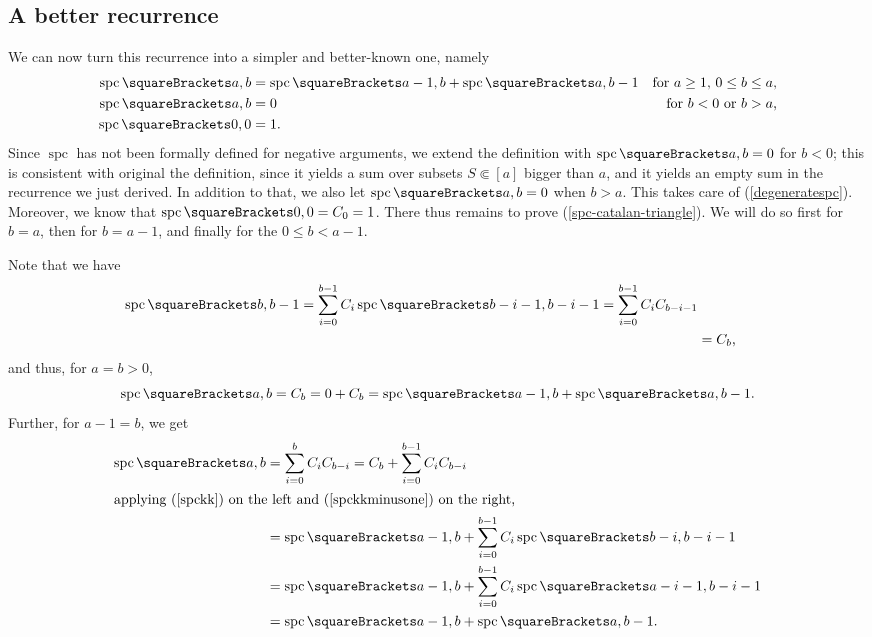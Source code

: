 \documentclass[10pt, a4paper, twoside]{basestyle}
\DeclareMathOperator{\spc}{spc}
\begin{document}
\subsection{A better recurrence}
We can now turn this recurrence into a simpler and better-known one, namely
\begin{align}
\spc\of{a,b} &= \spc\of{a-1, b} + \spc\of{a,b-1} & \text{for $a\geq 1$, $0\leq b \leq a$,}\label{spc-catalan-triangle}\\
\spc\of{a,b} &= 0 & \text{for $b < 0$ or $b > a$,}\label{degeneratespc}\\
\spc\of{0,0} &= 1 \label{spc00}\text.
\end{align}
Since $\spc$ has not been formally defined for negative arguments, we extend the definition
with $\spc\of{a,b}=0$ for $b<0$; this is consistent with original the definition, since it yields a sum over
subsets $S\Subset [a]$ bigger than $a$, and it yields an empty sum in the recurrence we just derived.
In addition to that, we also let $\spc\of{a,b} = 0$ when $b > a$. This takes care of (\ref{degeneratespc}).
Moreover, we know that $\spc\of{0,0}=C_0=1$. There thus remains to prove (\ref{spc-catalan-triangle}).
We will do so first for $b=a$, then for $b=a-1$, and finally for the $0\leq b < a-1$.

Note that we have\begin{align}
\spc\of{b, b-1}
= \sum{i=0}[b-1]C_{i}\spc\of{b-i-1,b-i-1} 
= \sum{i=0}[b-1]C_{i}C_{b-i-1} \nonumber \\
&= C_{b}\text,\label{spckkminusone}
\end{align}
and thus, for $a=b > 0$,
\begin{equation}
\spc\of{a,b} = C_b = 0 + C_b = \spc\of{a-1, b} + \spc\of{a, b-1}.
\end{equation}
Further, for $a - 1 = b$, we get
\begin{align}
\spc\of{a,b}
&= \sum{i=0}[b]C_{i}C_{b-i} = C_b + \sum{i=0}[b-1]C_{i}C_{b-i} \nonumber\\
\intertext{applying (\ref{spckk}) on the left and (\ref{spckkminusone}) on the right,}
&= \spc\of{a-1, b} + \sum{i=0}[b-1]C_{i}\spc\of{b-i,b-i-1} \nonumber\\
&= \spc\of{a-1, b} + \sum{i=0}[b-1]C_{i}\spc\of{a-i-1,b-i-1} \nonumber\\
&= \spc\of{a-1, b} + \spc\of{a,b-1}\text.
\end{align}
\end{document}
